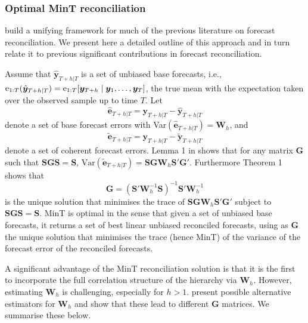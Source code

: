 \documentclass[graybox]{svmult}
\begin{document}
\subsubsection{Optimal MinT reconciliation}

\citet{WicEtAl2019} build a unifying framework for much of the previous literature on forecast reconciliation. We present here a detailed outline of this approach and in turn relate it to previous significant contributions in forecast reconciliation.

Assume that $\hat{\bm{y}}_{T+h|T}$ is a set of unbiased base forecasts, i.e., $\mathrm{e}_{1:T}(\hat{\bm{y}}_{T+h|T})= \mathrm{e}_{1:T}[\bm{y}_{T+h}\mid\bm{y}_1,\dots,\bm{y}_T]$, the true mean with the expectation taken over the observed sample up to time $T$.
Let
\begin{equation}\label{eq:base errors}
	\hat{\bm{e}}_{T+h|T} = \bm{y}_{T+h|T}-\hat{\bm{y}}_{T+h|T}
\end{equation}
denote a set of base forecast errors with Var$(\hat{\bm{e}}_{T+h|T})=\bm{W}_h$, and
\begin{equation*}
	\tilde{\bm{e}}_{T+h|T} = \bm{y}_{T+h|T}-\tilde{\bm{y}}_{T+h|T}
\end{equation*} denote a set of coherent forecast errors. Lemma 1 in \citet{WicEtAl2019} shows that for any matrix $\bm{G}$ such that $\bm{S}\bm{G}\bm{S}=\bm{S}$, $\text{Var}(\tilde{\bm{e}}_{T+h|T})=\bm{S}\bm{G}\bm{W}_h\bm{S}'\bm{G}'
$. Furthermore Theorem 1 shows that
\begin{equation} \label{eq:MinT}
	\bm{G} = (\bm{S}'{\bm{W}}^{-1}_h\bm{S})^{-1}\bm{S}'{\bm{W}}^{-1}_h
\end{equation}
is the unique solution that minimises the trace of $\bm{S}\bm{G}\bm{W}_h\bm{S}'\bm{G}'$ subject to $\bm{S}\bm{G}\bm{S}=\bm{S}$. MinT is optimal in the sense that given a set of unbiased base forecasts, it returns a set of best linear unbiased reconciled forecasts, using as $\bm{G}$ the unique solution that minimises the trace (hence MinT) of the variance of the forecast error of the reconciled forecasts.

A significant advantage of the MinT reconciliation solution is that it is the first to incorporate the full correlation structure of the hierarchy via $\bm{W}_{h}$. However, estimating $\bm{W}_{h}$ is challenging, especially for $h>1$. \citet{WicEtAl2019} present possible alternative estimators for $\bm{W}_{h}$ and show that these lead to different $\bm{G}$ matrices. We summarise these below.
\end{document}
